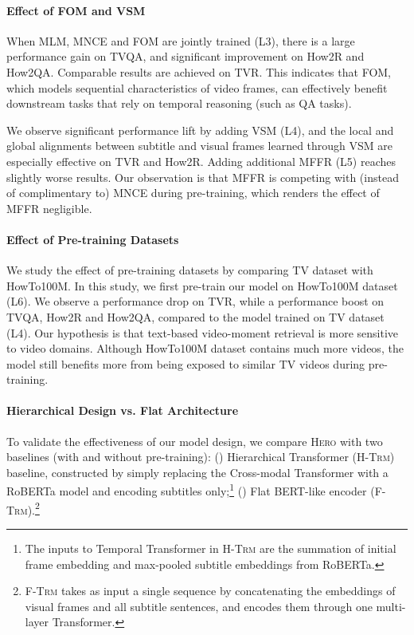 \documentclass[11pt,a4paper]{article}
\begin{document}
\paragraph{Effect of FOM and VSM}
When MLM, MNCE and FOM are jointly trained (L3), there is a large performance gain on TVQA, and significant improvement on How2R and How2QA. Comparable results are achieved on TVR. This indicates that FOM, which models sequential characteristics of video frames, can effectively benefit downstream tasks that rely on temporal reasoning (such as QA tasks). 

We observe significant performance lift by adding VSM (L4), and the local and global alignments between subtitle and visual frames learned through VSM are especially effective on TVR and How2R. Adding additional MFFR (L5) reaches slightly worse results. Our observation is that MFFR is competing with (instead of complimentary to) MNCE during pre-training, which renders the effect of MFFR negligible. 

\paragraph{Effect of Pre-training Datasets}
We study the effect of pre-training datasets by comparing TV dataset with HowTo100M. In this study, we first pre-train our model on HowTo100M dataset (L6). We observe a performance drop on TVR, while a performance boost on TVQA, How2R and How2QA, compared to the model trained on TV dataset (L4). Our hypothesis is that text-based video-moment retrieval is more sensitive to video domains. Although HowTo100M dataset contains much more videos, the model still benefits more from being exposed to similar TV videos during pre-training.


\paragraph{Hierarchical Design vs. Flat Architecture}
To validate the effectiveness of our model design, we compare \textsc{Hero} with two baselines (with and without pre-training): () Hierarchical Transformer (\textsc{H-Trm}) baseline, constructed by simply replacing the Cross-modal Transformer with a RoBERTa model and encoding subtitles only;\footnote{The inputs to Temporal Transformer in \textsc{H-Trm} are the summation of initial frame embedding and max-pooled subtitle embeddings from RoBERTa.}
() Flat BERT-like encoder (\textsc{F-Trm}).\footnote{\textsc{F-Trm} takes as input a single sequence by concatenating the embeddings of visual frames and all subtitle sentences, and encodes them through one multi-layer Transformer.} 
\end{document}
